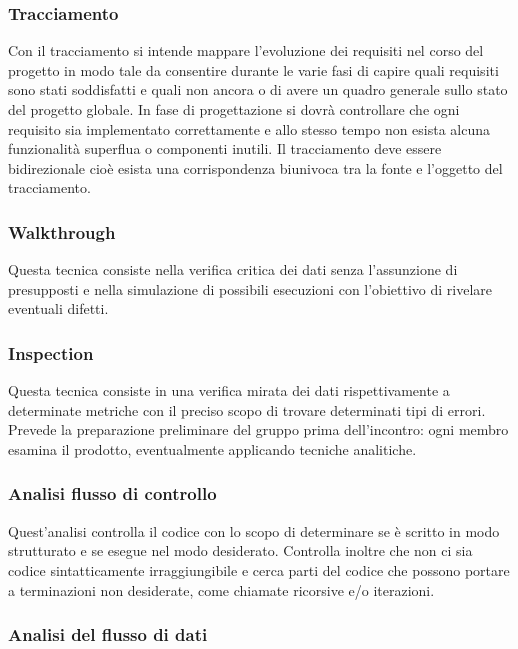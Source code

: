 \subsubsection{Tracciamento}

Con il tracciamento si intende mappare l'evoluzione dei requisiti nel corso del
progetto in modo tale da consentire durante le varie fasi di capire quali
requisiti sono stati soddisfatti e quali non ancora o di avere un quadro
generale sullo stato del progetto globale. In fase di progettazione si dovr\`a
controllare che ogni requisito sia implementato correttamente e allo stesso
tempo non esista alcuna funzionalit\`a superflua o componenti inutili. Il
tracciamento deve essere bidirezionale cio\`e esista una
corrispondenza biunivoca tra la fonte e l'oggetto del tracciamento.

\subsubsection{Walkthrough}

Questa tecnica consiste nella verifica critica dei dati senza
l'assunzione di presupposti e nella simulazione di possibili esecuzioni con l'obiettivo
di rivelare eventuali difetti.

\subsubsection{Inspection}

Questa tecnica consiste in una verifica mirata dei dati rispettivamente a
determinate metriche con il preciso scopo di trovare determinati tipi di errori.
Prevede la preparazione preliminare del gruppo prima dell'incontro: ogni membro esamina il prodotto, eventualmente applicando tecniche analitiche.

\subsubsection{Analisi flusso di controllo}

Quest'analisi controlla il codice con lo scopo di determinare se \`e scritto in
modo strutturato e se esegue nel modo desiderato. Controlla inoltre che non ci
sia codice sintatticamente irraggiungibile e cerca parti del codice che possono
portare a terminazioni non desiderate, come chiamate ricorsive e/o iterazioni.

\subsubsection{Analisi del flusso di dati}

